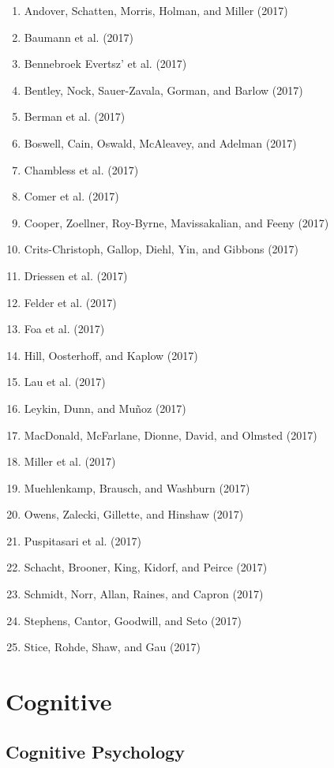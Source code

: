 \documentclass[english,man]{apa6}
\providecommand{\tightlist}{%
  \setlength{\itemsep}{0pt}\setlength{\parskip}{0pt}}
\theoremstyle{definition}
\theoremstyle{definition}
\theoremstyle{definition}
\theoremstyle{remark}
\begin{document}
\begin{enumerate}
\def\labelenumi{\arabic{enumi})}
\tightlist
\item
  Andover, Schatten, Morris, Holman, and Miller (2017)
\item
  Baumann et al. (2017)
\item
  Bennebroek Evertsz' et al. (2017)
\item
  Bentley, Nock, Sauer-Zavala, Gorman, and Barlow (2017)
\item
  Berman et al. (2017)
\item
  Boswell, Cain, Oswald, McAleavey, and Adelman (2017)
\item
  Chambless et al. (2017)
\item
  Comer et al. (2017)
\item
  Cooper, Zoellner, Roy-Byrne, Mavissakalian, and Feeny (2017)
\item
  Crits-Christoph, Gallop, Diehl, Yin, and Gibbons (2017)
\item
  Driessen et al. (2017)
\item
  Felder et al. (2017)
\item
  Foa et al. (2017)
\item
  Hill, Oosterhoff, and Kaplow (2017)
\item
  Lau et al. (2017)
\item
  Leykin, Dunn, and Muñoz (2017)
\item
  MacDonald, McFarlane, Dionne, David, and Olmsted (2017)
\item
  Miller et al. (2017)
\item
  Muehlenkamp, Brausch, and Washburn (2017)
\item
  Owens, Zalecki, Gillette, and Hinshaw (2017)
\item
  Puspitasari et al. (2017)
\item
  Schacht, Brooner, King, Kidorf, and Peirce (2017)
\item
  Schmidt, Norr, Allan, Raines, and Capron (2017)
\item
  Stephens, Cantor, Goodwill, and Seto (2017)
\item
  Stice, Rohde, Shaw, and Gau (2017)
\end{enumerate}

\section{Cognitive}\label{cognitive}

\subsection{Cognitive Psychology}\label{cognitive-psychology}
\end{document}
